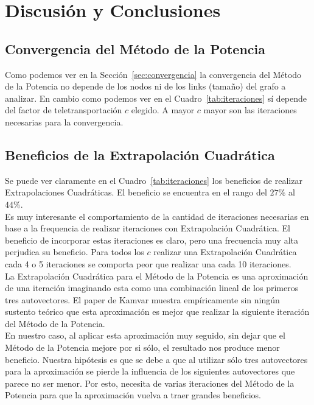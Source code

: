 \section{Discusión y Conclusiones}

\subsection{Convergencia del Método de la Potencia}

Como podemos ver en la Sección~\ref{sec:convergencia} la convergencia del
Método de la Potencia no depende de los nodos ni de los links (tamaño) del
grafo a analizar. En cambio como podemos ver en el Cuadro~\ref{tab:iteraciones}
sí depende del factor de teletransportación $c$ elegido. A mayor $c$ mayor son
las iteraciones necesarias para la convergencia.

\subsection{Beneficios de la Extrapolación Cuadrática}

Se puede ver claramente en el Cuadro~\ref{tab:iteraciones} los beneficios de
realizar Extrapolaciones Cuadráticas. El beneficio se encuentra en el rango del
$27\%$ al $44\%$.\\

Es muy interesante el comportamiento de la cantidad de iteraciones necesarias
en base a la frequencia de realizar iteraciones con Extrapolación Cuadrática.
El beneficio de incorporar estas iteraciones es claro, pero una frecuencia muy
alta perjudica su beneficio. Para todos los $c$ realizar una Extrapolación
Cuadrática cada 4 o 5 iteraciones se comporta peor que realizar una cada 10
iteraciones.\\

La Extrapolación Cuadrática para el Método de la Potencia es una aproximación
de una iteración imaginando esta como una combinación lineal de los primeros
tres autovectores. El paper de Kamvar muestra empíricamente sin ningún
sustento teórico que esta aproximación es mejor que realizar la siguiente
iteración del Método de la Potencia.\\

En nuestro caso, al aplicar esta aproximación muy seguido, sin dejar que el
Método de la Potencia mejore por si sólo, el resultado nos produce menor
beneficio. Nuestra hipótesis es que se debe a que al utilizar sólo tres
autovectores para la aproximación se pierde la influencia de los siguientes
autovectores que parece no ser menor. Por esto, necesita de varias iteraciones
del Método de la Potencia para que la aproximación vuelva a traer grandes
beneficios.\\

